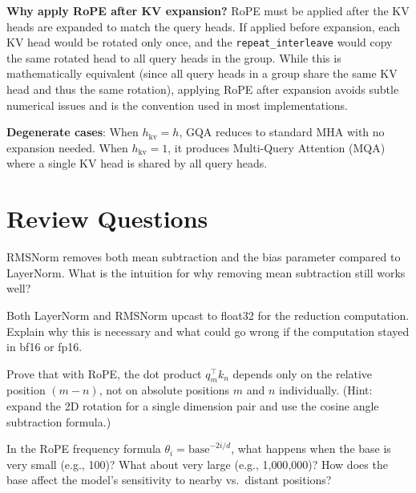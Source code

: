 \begin{keyconcept}
  \textbf{Why apply RoPE after KV expansion?} RoPE must be applied after the
  KV heads are expanded to match the query heads. If applied before expansion,
  each KV head would be rotated only once, and the \texttt{repeat\_interleave}
  would copy the same rotated head to all query heads in the group. While this
  is mathematically equivalent (since all query heads in a group share the same
  KV head and thus the same rotation), applying RoPE after expansion avoids
  subtle numerical issues and is the convention used in most implementations.

  \textbf{Degenerate cases}: When $h_{\text{kv}} = h$, GQA reduces to
  standard MHA with no expansion needed. When $h_{\text{kv}} = 1$, it
  produces Multi-Query Attention (MQA) where a single KV head is shared by
  all query heads.
\end{keyconcept}

\section*{Review Questions}

\begin{reviewquestion}[1]
  RMSNorm removes both mean subtraction and the bias parameter compared
  to LayerNorm. What is the intuition for why removing mean subtraction
  still works well?
\end{reviewquestion}

\begin{reviewquestion}[2]
  Both LayerNorm and RMSNorm upcast to float32 for the reduction
  computation. Explain why this is necessary and what could go wrong if
  the computation stayed in bf16 or fp16.
\end{reviewquestion}

\begin{reviewquestion}[3]
  Prove that with RoPE, the dot product $q_m^\top k_n$ depends only on
  the relative position $(m - n)$, not on absolute positions $m$ and $n$
  individually. (Hint: expand the 2D rotation for a single dimension pair
  and use the cosine angle subtraction formula.)
\end{reviewquestion}

\begin{reviewquestion}[4]
  In the RoPE frequency formula $\theta_i = \text{base}^{-2i/d}$, what
  happens when the base is very small (e.g., 100)? What about very large
  (e.g., 1{,}000{,}000)? How does the base affect the model's sensitivity
  to nearby vs.\ distant positions?
\end{reviewquestion}

